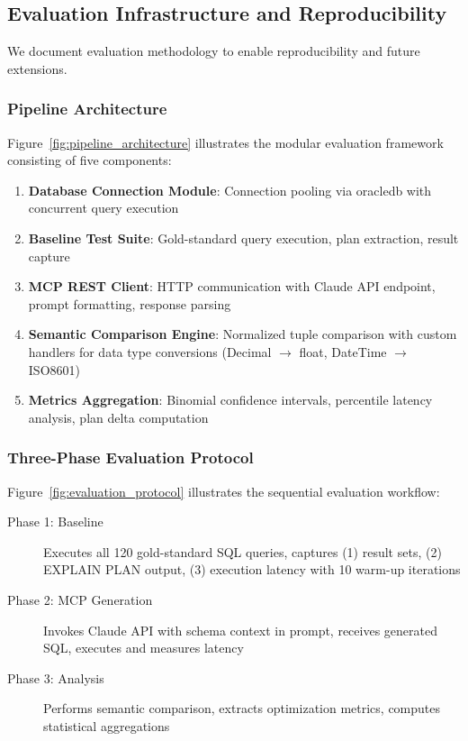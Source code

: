 

\subsection{Evaluation Infrastructure and Reproducibility}

We document evaluation methodology to enable reproducibility and future extensions.



\subsubsection{Pipeline Architecture}

Figure~\ref{fig:pipeline_architecture} illustrates the modular evaluation framework consisting of five components:

\begin{enumerate}
    \item \textbf{Database Connection Module}: Connection pooling via oracledb with concurrent query execution
    \item \textbf{Baseline Test Suite}: Gold-standard query execution, plan extraction, result capture
    \item \textbf{MCP REST Client}: HTTP communication with Claude API endpoint, prompt formatting, response parsing
    \item \textbf{Semantic Comparison Engine}: Normalized tuple comparison with custom handlers for data type conversions (Decimal $\to$ float, DateTime $\to$ ISO8601)
    \item \textbf{Metrics Aggregation}: Binomial confidence intervals, percentile latency analysis, plan delta computation
\end{enumerate}



\subsubsection{Three-Phase Evaluation Protocol}

Figure~\ref{fig:evaluation_protocol} illustrates the sequential evaluation workflow:

\begin{description}
    \item[Phase 1: Baseline] Executes all 120 gold-standard SQL queries, captures (1) result sets, (2) EXPLAIN PLAN output, (3) execution latency with 10 warm-up iterations
    \item[Phase 2: MCP Generation] Invokes Claude API with schema context in prompt, receives generated SQL, executes and measures latency
    \item[Phase 3: Analysis] Performs semantic comparison, extracts optimization metrics, computes statistical aggregations
\end{description}

